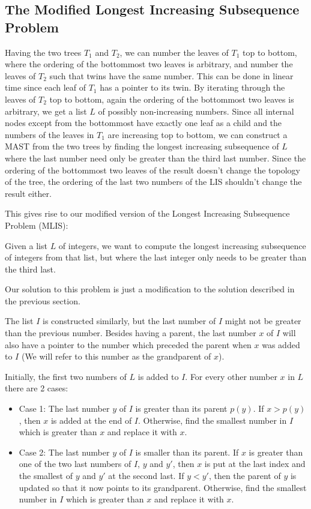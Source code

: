 \subsection{The Modified Longest Increasing Subsequence Problem}
\label{mlisSection}
Having the two trees $T_1$ and $T_2$, we can number the leaves of $T_1$ top to bottom, where the ordering of the bottommost two leaves is arbitrary, and number the leaves of $T_2$ such that twins have the same number. This can be done in linear time since each leaf of $T_1$ has a pointer to its twin. By iterating through the leaves of $T_2$ top to bottom, again the ordering of the bottommost two leaves is arbitrary, we get a list $L$ of possibly non-increasing numbers. Since all internal nodes except from the bottommost have exactly one leaf as a child and the numbers of the leaves in $T_1$ are increasing top to bottom, we can construct a MAST from the two trees by finding the longest increasing subsequence of $L$ where the last number need only be greater than the third last number. Since the ordering of the bottommost two leaves of the result doesn't change the topology of the tree, the ordering of the last two numbers of the LIS shouldn't change the result either.

This gives rise to our modified version of the Longest Increasing Subsequence Problem (MLIS):

Given a list $L$ of integers, we want to compute the longest increasing subsequence of integers from that list, but where the last integer only needs to be greater than the third last.

Our solution to this problem is just a modification to the solution described in the previous section.

The list $I$ is constructed similarly, but the last number of $I$ might not be greater than the previous number. Besides having a parent, the last number $x$ of $I$ will also have a pointer to the number which preceded the parent when $x$ was added to $I$ (We will refer to this number as the grandparent of $x$).

Initially, the first two numbers of $L$ is added to $I$. For every other number $x$ in $L$ there are 2 cases:

\begin{itemize}
	\item Case 1: The last number $y$ of $I$ is greater than its parent $p(y)$.
	\subitem If $x > p(y)$, then $x$ is added at the end of $I$.
	\subitem Otherwise, find the smallest number in $I$ which is greater than $x$ and replace it with $x$.
	\item Case 2: The last number $y$ of $I$ is smaller than its parent.
	\subitem If $x$ is greater than one of the two last numbers of $I$, $y$ and $y'$, then $x$ is put at the last index and the smallest of $y$ and $y'$ at the second last.
	\subsubitem If $y < y'$, then the parent of $y$ is updated so that it now points to its grandparent.
	\subitem Otherwise, find the smallest number in $I$ which is greater than $x$ and replace it with $x$.
\end{itemize}

